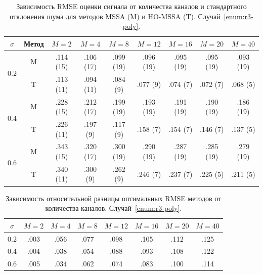 \documentclass[specialist,
  substylefile = spbu.rtx,
subf,href,colorlinks=true, 12pt]{disser}
\theoremstyle{plain}
\theoremstyle{definition}
\theoremstyle{remark}
\begin{document}
\begin{table}[!ht]
  \centering
  \caption{Зависимость RMSE оценки сигнала от количества каналов и
    стандартного отклонения шума для методов MSSA (M) и HO-MSSA (T).
  Случай~\ref{enum:r3-poly}.}
  \label{tab:r3-rmse-poly}
  {\small
    \begin{tabular}{c|c|ccccccc}
      $\sigma$ & Метод & $M = 2$ & $M = 4$ & $M = 8$ & $M = 12$ &
      $M = 16$ & $M
      = 20$ & $M = 40$ \\ \hline
      \multirow{2}{1.3em}{0.2} & M & .114 (15) & .106 (17) & .099 (19) &
      .096 (19) & .095 (19) & .095 (19) & .093 (19) \\
      & T & .113 (11) & .094 (11) & .084 (9) & .077 (9) & .074 (7) & .072 (7)
      & .068 (5) \\
      \hline
      \multirow{2}{1.3em}{0.4} & M & .228 (15) & .212 (17) & .199 (19) &
      .193 (19) & .191 (19) & .190 (19) & .186 (19) \\
      & T & .226 (11) & .197 (9) & .117 (9) & .158 (7) & .154 (7) & .146 (7)
      & .137 (5) \\
      \hline
      \multirow{2}{1.3em}{0.6} & M & .343 (15) & .320 (17) & .300 (19) &
      .290 (19) & .287 (19) & .285 (19) & .279 (19) \\
      & T & .340 (11) & .300 (9) & .262 (9) & .246 (7) & .237 (7) & .225 (5)
      & .211 (5) \\
      \hline
    \end{tabular}
  }
\end{table}
\begin{table}[!ht]
  \centering
  \caption{Зависимость относительной разницы оптимальных RMSE методов от
  количества каналов. Случай~\ref{enum:r3-poly}.}
  \label{tab:r3-errdiff-poly}
  \begin{tabular}{c|ccccccc}
    $\sigma$ & $M = 2$ & $M = 4$ & $M = 8$ & $M = 12$ & $M = 16$ & $M
    = 20$ & $M = 40$ \\ \hline
    0.2 & .003 & .056 & .077 & .098 & .105 & .112 & .125 \\
    \hline
    0.4 & .004 & .038 & .054 & .088 & .093 & .108 & .122 \\
    \hline
    0.6 & .005 & .034 & .062 & .074 & .083 & .100 & .114 \\
    \hline
  \end{tabular}
\end{table}
\end{document}
